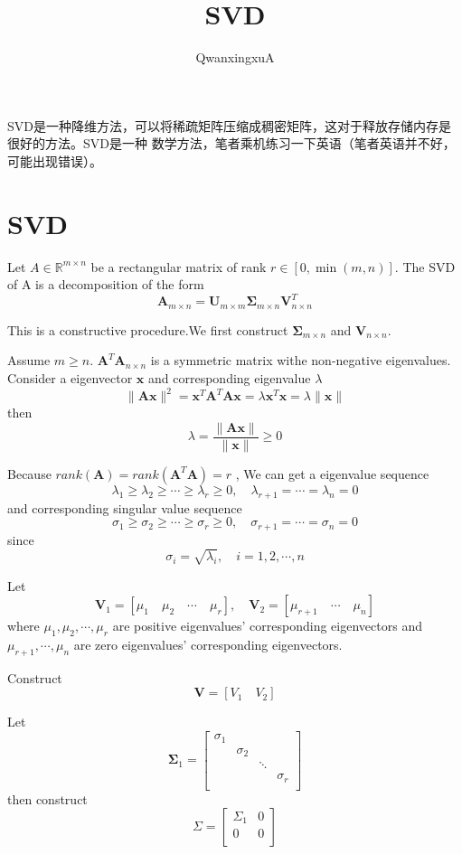 \documentclass{article}
\title{SVD}
\author{QwanxingxuA}
\begin{document}
\maketitle
    SVD是一种降维方法，可以将稀疏矩阵压缩成稠密矩阵，这对于释放存储内存是很好的方法。SVD是一种
    数学方法，笔者乘机练习一下英语（笔者英语并不好，可能出现错误）。
    \section{SVD}
        Let $A\in \mathbb{R}^{m\times n}$ be a rectangular matrix of rank $r \in[0,\min(m,n)]$. The SVD of A is a decomposition of the form
        \[\boldsymbol{A}_{m\times n}=\boldsymbol{U}_{m\times m}\boldsymbol{\Sigma}_{m\times n}\boldsymbol{V}_{n\times n}^T\] 

        This is a constructive procedure.We first construct $\boldsymbol{\Sigma}_{m\times n}$ and $\boldsymbol{V}_{n\times n}$.

        Assume $m\ge n$. $\boldsymbol{A}^T\boldsymbol{A}_{n\times n}$ is a symmetric matrix withe non-negative eigenvalues. Consider a eigenvector
        $\boldsymbol{x}$ and corresponding eigenvalue $\lambda$
        \[\|\boldsymbol{A}\boldsymbol{x}\|^2=\boldsymbol{x}^T\boldsymbol{A}^T\boldsymbol{A}\boldsymbol{x}=\lambda\boldsymbol{x}^T\boldsymbol{x}=\lambda\|\boldsymbol{x}\|\]
        then
        \[\lambda=\frac{\|\boldsymbol{A}\boldsymbol{x}\|}{\|\boldsymbol{x}\|}\ge 0\]

        Because $rank(\boldsymbol{A})=rank(\boldsymbol{A}^T\boldsymbol{A})=r$ , We can get a eigenvalue sequence 
        \[\lambda_1\ge\lambda_2\ge\cdots\ge\lambda_r\ge0,\quad \lambda_{r+1}=\cdots=\lambda_n=0\]
        and corresponding singular value sequence
        \[\sigma_1\ge\sigma_2\ge\cdots\ge\sigma_r\ge0,\quad \sigma_{r+1}=\cdots=\sigma_n=0\]
        since
        \[\sigma_i=\sqrt{\lambda_i},\quad i=1,2,\cdots,n\]
        
        Let 
        \[\boldsymbol{V}_1=[\mu_1\quad\mu_2\quad\cdots\quad\mu_r],\quad\boldsymbol{V}_2=[\mu_{r+1}\quad\cdots\quad\mu_n]\]
        where $\mu_1,\mu_2,\cdots,\mu_r$ are positive eigenvalues' corresponding eigenvectors and $\mu_{r+1},\cdots,\mu_n$ are zero eigenvalues'  corresponding eigenvectors.

        Construct
        \[\boldsymbol{V}=[V_1\quad V_2]\]

        Let
        \[\boldsymbol{\Sigma}_1=\begin{bmatrix}
            \sigma_1&&&\\
            &\sigma_2&&\\
            &&\ddots&\\
            &&&\sigma_r\\
        \end{bmatrix}\]
        then construct 
        \[\Sigma=\begin{bmatrix}
            \Sigma_1&0\\
            0&0\\
        \end{bmatrix}\]
\end{document}
